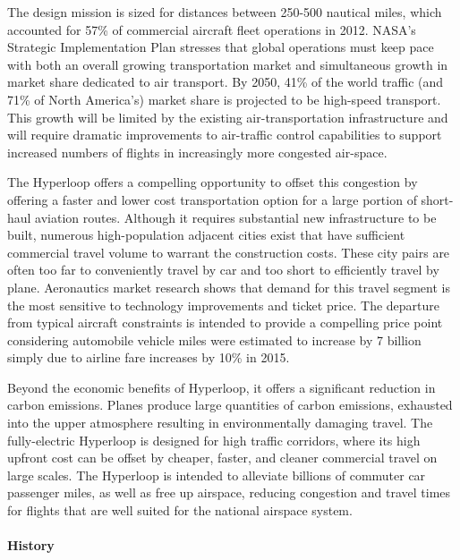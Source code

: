     The design mission is sized for distances between 250-500 nautical miles,
    which accounted for 57\% of commercial aircraft fleet operations in 2012.
    NASA's Strategic Implementation Plan stresses that global operations must
    keep pace with both an overall growing transportation market and
    simultaneous growth in market share dedicated to air transport.
    By 2050, 41\% of the world traffic (and 71\% of North America's) market share is
    projected to be high-speed transport. \cite{Schafer} This growth will be
    limited by the existing air-transportation infrastructure and will require
    dramatic improvements to air-traffic control capabilities to support
    increased numbers of flights in increasingly more congested air-space.

    The Hyperloop offers a compelling opportunity to offset this congestion by
    offering a faster and lower cost transportation option for a large portion
    of short-haul aviation routes. Although it requires substantial
    new infrastructure to be built, numerous high-population adjacent
    cities exist that have sufficient commercial travel volume to warrant the
    construction costs. These city pairs are often too far to conveniently
    travel by car and too short to efficiently travel by plane.
    Aeronautics market research shows that demand for this travel segment is
    the most sensitive to technology improvements and ticket price.\cite{Baik}
    The departure from typical aircraft constraints is intended to provide a
    compelling price point considering automobile vehicle miles were
    estimated to increase by 7 billion simply due to airline
    fare increases by 10\% in 2015. \cite{Baik}

    Beyond the economic benefits of Hyperloop, it offers a significant
    reduction in carbon emissions. Planes produce large quantities of carbon emissions,
    exhausted into the upper atmosphere resulting in environmentally damaging travel.
    The fully-electric Hyperloop is designed for high traffic corridors,
    where its high upfront cost can be offset by cheaper, faster, and cleaner
    commercial travel on large scales.
    The Hyperloop is intended to alleviate billions of commuter car passenger miles,
    as well as free up airspace, reducing congestion and travel times for
    flights that are well suited for the national airspace system.

\paragraph{History}

